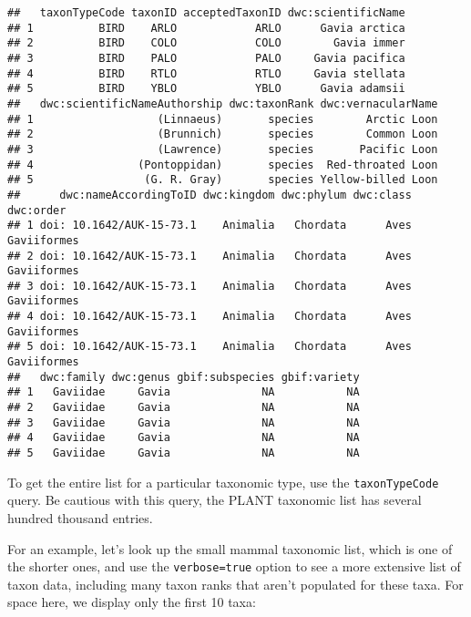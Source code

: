 \documentclass[]{book}
\newenvironment{Shaded}{\begin{snugshade}}{\end{snugshade}}
\newcommand{\DataTypeTok}[1]{\textcolor[rgb]{0.13,0.29,0.53}{#1}}
\newcommand{\DecValTok}[1]{\textcolor[rgb]{0.00,0.00,0.81}{#1}}
\newcommand{\KeywordTok}[1]{\textcolor[rgb]{0.13,0.29,0.53}{\textbf{#1}}}
\newcommand{\NormalTok}[1]{#1}
\newcommand{\OperatorTok}[1]{\textcolor[rgb]{0.81,0.36,0.00}{\textbf{#1}}}
\newcommand{\StringTok}[1]{\textcolor[rgb]{0.31,0.60,0.02}{#1}}
\begin{document}
\begin{verbatim}
##   taxonTypeCode taxonID acceptedTaxonID dwc:scientificName
## 1          BIRD    ARLO            ARLO      Gavia arctica
## 2          BIRD    COLO            COLO        Gavia immer
## 3          BIRD    PALO            PALO     Gavia pacifica
## 4          BIRD    RTLO            RTLO     Gavia stellata
## 5          BIRD    YBLO            YBLO      Gavia adamsii
##   dwc:scientificNameAuthorship dwc:taxonRank dwc:vernacularName
## 1                   (Linnaeus)       species        Arctic Loon
## 2                   (Brunnich)       species        Common Loon
## 3                   (Lawrence)       species       Pacific Loon
## 4                (Pontoppidan)       species  Red-throated Loon
## 5                 (G. R. Gray)       species Yellow-billed Loon
##      dwc:nameAccordingToID dwc:kingdom dwc:phylum dwc:class   dwc:order
## 1 doi: 10.1642/AUK-15-73.1    Animalia   Chordata      Aves Gaviiformes
## 2 doi: 10.1642/AUK-15-73.1    Animalia   Chordata      Aves Gaviiformes
## 3 doi: 10.1642/AUK-15-73.1    Animalia   Chordata      Aves Gaviiformes
## 4 doi: 10.1642/AUK-15-73.1    Animalia   Chordata      Aves Gaviiformes
## 5 doi: 10.1642/AUK-15-73.1    Animalia   Chordata      Aves Gaviiformes
##   dwc:family dwc:genus gbif:subspecies gbif:variety
## 1   Gaviidae     Gavia              NA           NA
## 2   Gaviidae     Gavia              NA           NA
## 3   Gaviidae     Gavia              NA           NA
## 4   Gaviidae     Gavia              NA           NA
## 5   Gaviidae     Gavia              NA           NA
\end{verbatim}

To get the entire list for a particular taxonomic type, use the
\texttt{taxonTypeCode} query. Be cautious with this query, the PLANT taxonomic
list has several hundred thousand entries.

For an example, let's look up the small mammal taxonomic list, which
is one of the shorter ones, and use the \texttt{verbose=true} option to see
a more extensive list of taxon data, including many taxon ranks that
aren't populated for these taxa. For space here, we display only
the first 10 taxa:

\begin{Shaded}
\end{Shaded}
\end{document}
